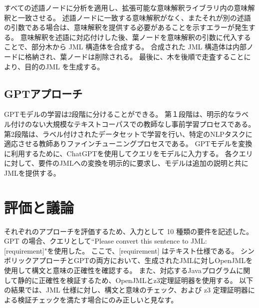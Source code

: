 \documentclass[uplatex, twocolumn,10pt]{jsarticle} %
\begin{document}
すべての述語ノードに分析を適用し、拡張可能な意味解釈ライブラリ内の意味解釈と一致させる。
述語ノードに一致する意味解釈がなく、またそれが別の述語の引数である場合は、意味解釈を提供する必要があることを示すエラーが発生する。
意味解釈を述語に対応付けした後、葉ノードを意味解釈の引数に代入することで、部分木から JML 構造体を合成する。
合成された JML 構造体は内部ノードに格納され、葉ノードは削除される。
最後に、木を後順で走査することにより、目的のJML を生成する。

\subsection{GPTアプローチ}
GPTモデル\cite{2}の学習は2段階に分けることができる。
第１段階は、明示的なラベル付けのない大規模なテキストコーパスでの教師なし事前学習プロセスである。
第2段階は、ラベル付けされたデータセットで学習を行い、特定のNLPタスクに適応させる教師ありファインチューニングプロセスである。
GPTモデルを変換に利用するために、ChatGPTを使用してクエリをモデルに入力する。
各クエリに対して、要件のJMLへの変換を明示的に要求し、モデルは追加の説明と共にJMLを提供する。

\section{評価と議論}
\label{sec:evaluation}
それぞれのアプローチを評価するため、入力として 10 種類の要件を記述した。
GPT の場合、クエリとして``Please convert this sentence to JML: [requirement]"を使用した。
ここで、[requirement] はテキスト仕様である。
シンボリックアプローチとGPTの両方において、生成されたJMLに対しOpenJML\cite{4}を使用して構文と意味の正確性を確認する。
また、対応するJavaプログラムに関して静的に正確性を検証するため、OpenJMLとz3\cite{5}定理証明器を使用する。
以下の結果では、JML 仕様に対し、構文と意味のチェック、および z3 定理証明器による検証チェックを満たす場合にのみ正しいと見なす。
\end{document}
